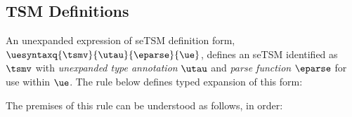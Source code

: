 \documentclass[acmlarge,review,anonymous]{acmart}\settopmatter{printfolios=true}
\begin{document}
\subsection{TSM Definitions}\label{sec:U-uetsm-definition}
An unexpanded expression of seTSM definition form, $\uesyntaxq{\tsmv}{\utau}{\eparse}{\ue}$, 
 defines an {seTSM} identified as $\tsmv$ with \emph{unexpanded type annotation} $\utau$ and \emph{parse function} $\eparse$ for use within $\ue$. The rule below defines typed expansion of this form:
\begin{mathpar}
\end{mathpar}
The premises of this rule can be understood as follows, in order:
\end{document}
